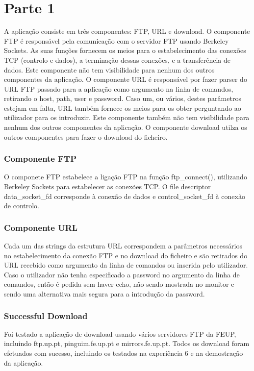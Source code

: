 \documentclass[a4paper]{article}
\begin{document}
\section{Parte 1}
A aplicação consiste em três componentes: FTP, URL e download.
O componente FTP é responsável pela comunicação com o servidor FTP usando Berkeley Sockets. As suas funções fornecem os meios para o estabelecimento das conexões TCP (controlo e dados), a terminação dessas conexões, e a transferência de dados. Este componente não tem visibilidade para nenhum dos outros componentes da aplicação.
O componente URL é responsável por fazer parser do URL FTP passado para a aplicação como argumento na linha de comandos, retirando o host, path, user e password. Caso um, ou vários, destes parâmetros estejam em falta, URL também fornece os meios para os obter perguntando ao utilizador para os introduzir. Este componente também não tem visibilidade para nenhum dos outros componentes da aplicação.
O componente download utilza os outros componentes para fazer o download do ficheiro.

\subsubsection{Componente FTP}
O componete FTP estabelece a ligação FTP na função ftp\_connect(), utilizando Berkeley Sockets para estabelecer as conexões TCP. O file descriptor data\_socket\_fd corresponde à conexão de dados e control\_socket\_fd à conexão de controlo.

\subsubsection{Componente URL}
Cada um das strings da estrutura URL correspondem a parâmetros necessários no estabelecimento da conexão FTP e no download do ficheiro e são retirados do URL recebido como argumento da linha de comandos ou inserida pelo utilizador. Caso o utilizador não tenha especificado a password no argumento da linha de comandos, então é pedida sem haver echo, não sendo mostrada no monitor e sendo uma alternativa mais segura para a introdução da password.

\subsubsection{Successful Download}
Foi testado a aplicação de download usando vários servidores FTP da FEUP, incluindo ftp.up.pt, pinguim.fe.up.pt e mirrors.fe.up.pt. Todos os download foram efetuados com sucesso, incluindo os testados na experiência 6 e na demostração da aplicação.
\end{document}
